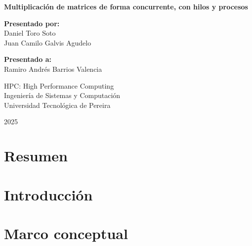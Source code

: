 \documentclass[12pt, letterpaper]{article}
\begin{document}
\begin{titlepage}
  \centering
  \vspace*{2cm}

  {\LARGE\bfseries Multiplicación de matrices de forma concurrente, con hilos y procesos\par}

  \vspace{2cm}

  {\large\textbf{Presentado por:}\\[0.4em]
  Daniel Toro Soto\\
  Juan Camilo Galvis Agudelo}

  \vspace{1.5cm}

  {\large\textbf{Presentado a:}\\[0.4em]
  Ramiro Andrés Barrios Valencia}

  \vspace{1.5cm}

  {\large HPC: High Performance Computing\\[0.3em]
  Ingeniería de Sistemas y Computación\\[0.3em]
  Universidad Tecnológica de Pereira}

  \vfill

  {\large 2025}
\end{titlepage}

\tableofcontents
\newpage

\section{Resumen}


\section{Introducción}


\section{Marco conceptual}
\end{document}
